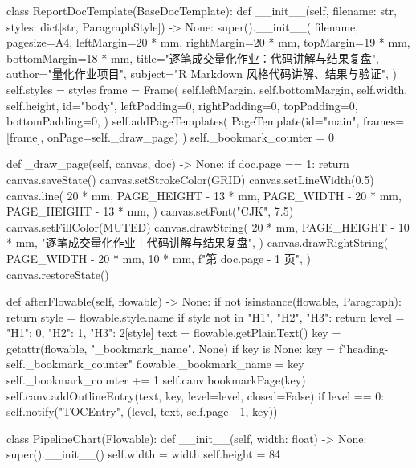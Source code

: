 \documentclass[UTF8,a4paper,fontset=fandol]{ctexart}
\begin{document}
\begin{ProjectCode}
class ReportDocTemplate(BaseDocTemplate):
    def __init__(self, filename: str, styles: dict[str, ParagraphStyle]) -> None:
        super().__init__(
            filename,
            pagesize=A4,
            leftMargin=20 * mm,
            rightMargin=20 * mm,
            topMargin=19 * mm,
            bottomMargin=18 * mm,
            title="逐笔成交量化作业：代码讲解与结果复盘",
            author="量化作业项目",
            subject="R Markdown 风格代码讲解、结果与验证",
        )
        self.styles = styles
        frame = Frame(
            self.leftMargin,
            self.bottomMargin,
            self.width,
            self.height,
            id="body",
            leftPadding=0,
            rightPadding=0,
            topPadding=0,
            bottomPadding=0,
        )
        self.addPageTemplates(
            PageTemplate(id="main", frames=[frame], onPage=self._draw_page)
        )
        self._bookmark_counter = 0

    def _draw_page(self, canvas, doc) -> None:
        if doc.page == 1:
            return
        canvas.saveState()
        canvas.setStrokeColor(GRID)
        canvas.setLineWidth(0.5)
        canvas.line(
            20 * mm,
            PAGE_HEIGHT - 13 * mm,
            PAGE_WIDTH - 20 * mm,
            PAGE_HEIGHT - 13 * mm,
        )
        canvas.setFont("CJK", 7.5)
        canvas.setFillColor(MUTED)
        canvas.drawString(
            20 * mm,
            PAGE_HEIGHT - 10 * mm,
            "逐笔成交量化作业｜代码讲解与结果复盘",
        )
        canvas.drawRightString(
            PAGE_WIDTH - 20 * mm,
            10 * mm,
            f"第 {doc.page - 1} 页",
        )
        canvas.restoreState()

    def afterFlowable(self, flowable) -> None:
        if not isinstance(flowable, Paragraph):
            return
        style = flowable.style.name
        if style not in {"H1", "H2", "H3"}:
            return
        level = {"H1": 0, "H2": 1, "H3": 2}[style]
        text = flowable.getPlainText()
        key = getattr(flowable, "_bookmark_name", None)
        if key is None:
            key = f"heading-{self._bookmark_counter}"
            flowable._bookmark_name = key
            self._bookmark_counter += 1
        self.canv.bookmarkPage(key)
        self.canv.addOutlineEntry(text, key, level=level, closed=False)
        if level == 0:
            self.notify("TOCEntry", (level, text, self.page - 1, key))


class PipelineChart(Flowable):
    def __init__(self, width: float) -> None:
        super().__init__()
        self.width = width
        self.height = 84


\end{ProjectCode}
\end{document}
